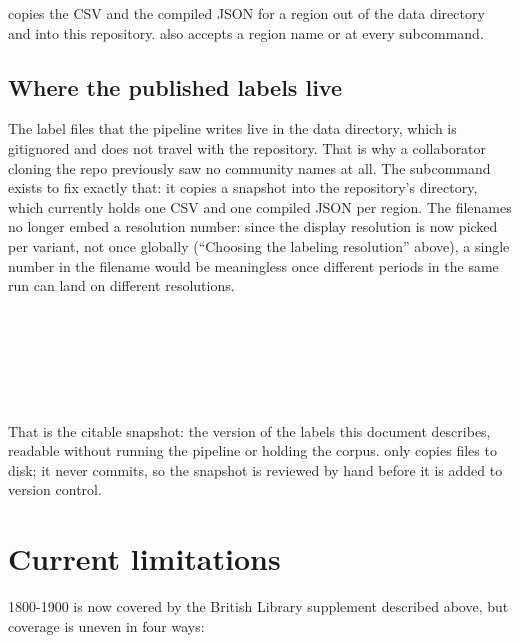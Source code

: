 \documentclass[11pt]{article}
\begin{document}
 copies the CSV and the compiled JSON for a region out of
the data directory and into this repository.  also
accepts a region name or  at every subcommand.

\subsection{Where the published labels live}

The label files that the pipeline writes live in the data directory,
which is gitignored and does not travel with the repository. That is why
a collaborator cloning the repo previously saw no community names at
all. The  subcommand exists to fix exactly that: it copies
a snapshot into the repository's  directory, which
currently holds one CSV and one compiled JSON per region. The filenames
no longer embed a resolution number: since the display resolution is now
picked per variant, not once globally (``Choosing the labeling
resolution'' above), a single number in the filename would be
meaningless once different periods in the same run can land on different
resolutions.

\begin{dobox}
\\
\\
\\
\\
\\
\end{dobox}

That is the citable snapshot: the version of the labels this document
describes, readable without running the pipeline or holding the corpus.
 only copies files to disk; it never commits, so the
snapshot is reviewed by hand before it is added to version control.

\section{Current limitations}

 1800-1900 is now covered by the British
Library supplement described above, but coverage is uneven in four
ways:
\end{document}
